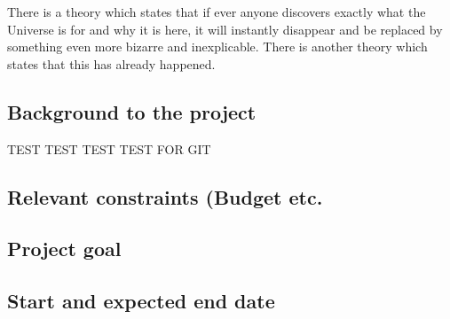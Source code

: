 There is a theory which states that if ever anyone discovers exactly what the Universe is for and why it is here, it will instantly disappear and be replaced by something even more bizarre and inexplicable.
There is another theory which states that this has already happened.

\subsection{Background to the project}
TEST TEST TEST TEST FOR GIT
\subsection{Relevant constraints (Budget etc.}

\subsection{Project goal}

\subsection{Start and expected end date}